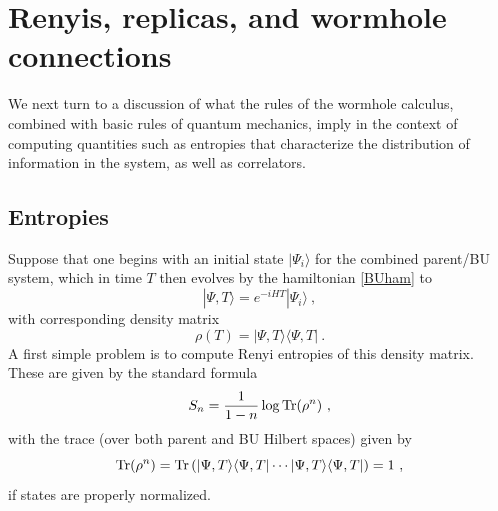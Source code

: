 \documentclass[11pt]{article}
\numberwithin{equation}{section}
\newcommand{\beq}{\begin{equation}}
\newcommand{\eeq}{\end{equation}}
\newcommand{\Tr}{{\rm Tr}}
\begin{document}
\section{Renyis, replicas, and wormhole connections}\label{sec:renyisrepwhc}

We next turn to a discussion of what the rules of the wormhole calculus, combined with basic rules of quantum mechanics, imply in the context of computing quantities such as entropies that characterize the distribution of information in the system, as well as correlators.

\subsection{Entropies}

Suppose that one begins with an initial state $|\Psi_i\rangle$ for the combined parent/BU system, which in time $T$ then evolves by the hamiltonian \eqref{BUham} to
\beq\label{Tstate}
|\Psi, T\rangle = e^{-i H T}|\Psi_i\rangle\ ,
\eeq
with corresponding density matrix
\beq\label{totdens}
\rho(T) = |\Psi, T\rangle \langle\Psi, T|\ .
\eeq
A first simple problem is to compute Renyi entropies of this density matrix.  These are given by the standard formula
\beq\label{Renyis}
S_n = \frac{1}{1-n}\log \Tr (\rho^n)\ , 
\eeq
with the trace (over both parent and BU Hilbert spaces) given by
\beq\label{trtr}
\Tr(\rho^n) = \Tr\left(|\Psi, T\rangle \langle\Psi, T| \cdots |\Psi, T\rangle \langle\Psi, T|\right) = 1\ ,
\eeq
if states are properly normalized.
\end{document}

